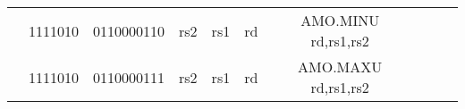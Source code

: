 \begin{table}[p]
\begin{small}
\begin{center}
\begin{tabular}{rcccccccccccl}
&
\multicolumn{1}{|c|}{1111010} &
\multicolumn{4}{c|}{0110000110} &
\multicolumn{1}{c|}{rs2} &
\multicolumn{1}{c|}{rs1} &
\multicolumn{1}{c|}{rd} & AMO.MINU rd,rs1,rs2 \\
\cline{2-9}
  

&
\multicolumn{1}{|c|}{1111010} &
\multicolumn{4}{c|}{0110000111} &
\multicolumn{1}{c|}{rs2} &
\multicolumn{1}{c|}{rs1} &
\multicolumn{1}{c|}{rd} & AMO.MAXU rd,rs1,rs2 \\
\cline{2-9}
  

\end{tabular}
\end{center}
\end{small}

\label{instr-table}
\end{table}
  

\newpage

